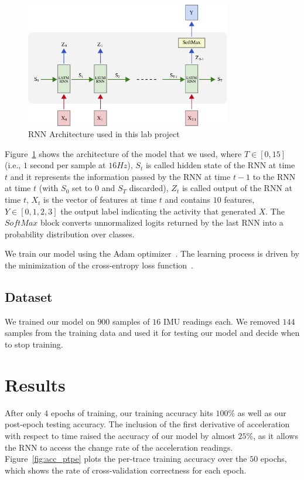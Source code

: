 \documentclass{article}
\begin{document}
\begin{figure}[t]
    \centering
    \vspace{-8pt}
    \includegraphics[width=0.8\textwidth]{figures/rnn_full}
    \caption{RNN Architecture used in this lab project \label{fig:rnn_architecture}}
    \vspace{-6pt}
\end{figure}

Figure~\ref{fig:rnn_architecture} shows the architecture of the model that we used, where
$T \in [0,15]$ (i.e., $1$ second per sample at $16Hz$), $S_t$ is called hidden state of the
RNN at time $t$ and it represents the information passed by the RNN at time $t-1$ to the RNN
at time $t$ (with $S_0$ set to $0$ and $S_T$ discarded), $Z_t$ is called output of the RNN
at time $t$, $X_t$ is the vector of features at time $t$ and contains $10$ features,
$Y \in [0,1,2,3]$ the output label indicating the activity that generated $X$.
The $SoftMax$ block converts
unnormalized logits returned by the last RNN into a probability distribution over classes.

We train our model using the Adam optimizer~\cite{kingma2014adam}.
The learning process is driven by the minimization of the cross-entropy loss
function~\cite{rubinstein1999cross}.

\subsection{Dataset}
\vspace{-.2cm}

We trained our model on $900$ samples of $16$ IMU readings each. We removed $144$ samples
from the training data and used it for testing our model and decide when to stop training.


\section{Results}
\vspace{-.3cm} 
After only $4$ epochs of training, our training accuracy hits $100\%$ as well as our 
post-epoch testing accuracy. 
The inclusion of the first derivative of acceleration with respect to time raised the accuracy 
of our model by almost $25\%$, as it allows the RNN to access the change rate of the 
acceleration readings. Figure~\ref{fig:acc_ptpe} plots the per-trace training
accuracy over the $50$ epochs, which shows the rate of cross-validation correctness 
for each epoch.
\end{document}
